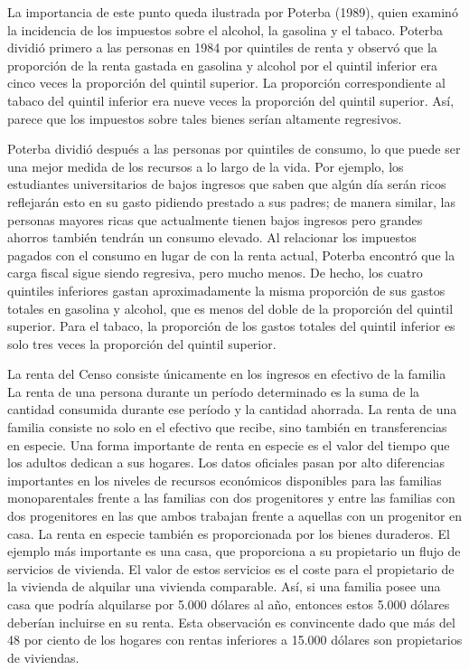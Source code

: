 \documentclass[10pt,a4paper]{article}
\begin{document}
{La importancia de este punto queda ilustrada por Poterba (1989), quien examinó la incidencia de los impuestos sobre el alcohol, la gasolina y el tabaco. Poterba dividió primero a las personas en 1984 por quintiles de renta y observó que la proporción de la renta gastada en gasolina y alcohol por el quintil inferior era cinco veces la proporción del quintil superior. La proporción correspondiente al tabaco del quintil inferior era nueve veces la proporción del quintil superior. Así, parece que los impuestos sobre tales bienes serían altamente regresivos.

Poterba dividió después a las personas por quintiles de consumo, lo que puede ser una mejor medida de los recursos a lo largo de la vida. Por ejemplo, los estudiantes universitarios de bajos ingresos que saben que algún día serán ricos reflejarán esto en su gasto pidiendo prestado a sus padres; de manera similar, las personas mayores ricas que actualmente tienen bajos ingresos pero grandes ahorros también tendrán un consumo elevado. Al relacionar los impuestos pagados con el consumo en lugar de con la renta actual, Poterba encontró que la carga fiscal sigue siendo regresiva, pero mucho menos. De hecho, los cuatro quintiles inferiores gastan aproximadamente la misma proporción de sus gastos totales en gasolina y alcohol, que es menos del doble de la proporción del quintil superior. Para el tabaco, la proporción de los gastos totales del quintil inferior es solo tres veces la proporción del quintil superior.}

La renta del Censo consiste únicamente en los ingresos en efectivo de la familia 
La renta de una persona durante un período determinado es la suma de la cantidad consumida durante ese período y la cantidad ahorrada. La renta de una familia consiste no solo en el efectivo que recibe, sino también en transferencias en especie. Una forma importante de renta en especie es el valor del tiempo que los adultos dedican a sus hogares. Los datos oficiales pasan por alto diferencias importantes en los niveles de recursos económicos disponibles para las familias monoparentales frente a las familias con dos progenitores y entre las familias con dos progenitores en las que ambos trabajan frente a aquellas con un progenitor en casa. La renta en especie también es proporcionada por los bienes duraderos. El ejemplo más importante es una casa, que proporciona a su propietario un flujo de servicios de vivienda. El valor de estos servicios es el coste para el propietario de la vivienda de alquilar una vivienda comparable. Así, si una familia posee una casa que podría alquilarse por 5.000 dólares al año, entonces estos 5.000 dólares deberían incluirse en su renta. Esta observación es convincente dado que más del 48 por ciento de los hogares con rentas inferiores a 15.000 dólares son propietarios de viviendas.
\end{document}
